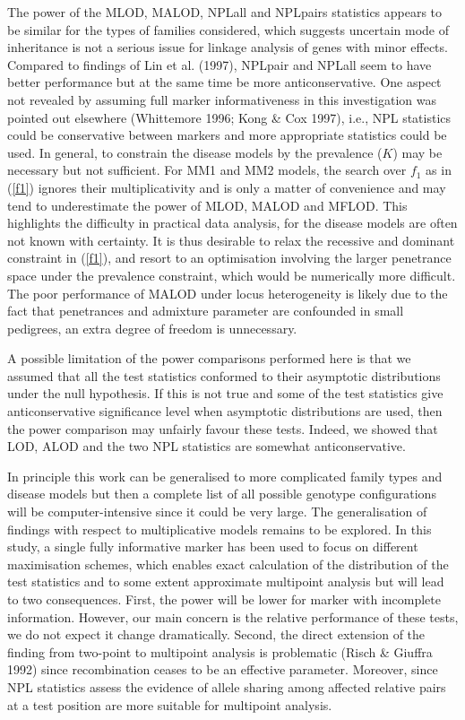 The power of the MLOD, MALOD, NPLall and NPLpairs statistics appears to be
similar for the types of families considered, which suggests uncertain
mode of inheritance is not a serious issue for linkage analysis of genes
with minor effects.  Compared to findings of Lin et al.  (1997), NPLpair
and NPLall seem to have better performance but at the same time be more
anticonservative.  One aspect not revealed by assuming full marker
informativeness in this investigation was pointed out elsewhere
(Whittemore 1996; Kong \& Cox 1997), i.e., NPL statistics could be
conservative between markers and more appropriate statistics could be
used.  In general, to constrain the disease models by the prevalence ($K$)
may be necessary but not sufficient.  For MM1 and MM2 models, the search
over $f_1$ as in (\ref{f1}) ignores their multiplicativity and is only a
matter of convenience and may tend to underestimate the power of MLOD,
MALOD and MFLOD. This highlights the difficulty in practical data
analysis, for the disease models are often not known with certainty. It is
thus desirable to relax the recessive and dominant constraint in
(\ref{f1}), and resort to an optimisation involving the larger penetrance
space under the prevalence constraint, which would be numerically more
difficult. The poor performance of MALOD under locus heterogeneity is
likely due to the fact that penetrances and admixture parameter are
confounded in small pedigrees, an extra degree of freedom is unnecessary.

A possible limitation of the power comparisons performed here is that we
assumed that all the test statistics conformed to their asymptotic
distributions under the null hypothesis. If this is not true and some of
the test statistics give anticonservative significance level when
asymptotic distributions are used, then the power comparison may unfairly
favour these tests. Indeed, we showed that LOD, ALOD and the two NPL
statistics are somewhat anticonservative.

In principle this work can be generalised to more complicated family types
and disease models but then a complete list of all possible genotype
configurations will be computer-intensive since it could be very large.  
The generalisation of findings with respect to multiplicative models
remains to be explored.  In this study, a single fully informative marker
has been used to focus on different maximisation schemes, which enables
exact calculation of the distribution of the test statistics and to some
extent approximate multipoint analysis but will lead to two consequences.  
First, the power will be lower for marker with incomplete information.  
However, our main concern is the relative performance of these tests, we
do not expect it change dramatically. Second, the direct extension of the
finding from two-point to multipoint analysis is problematic (Risch \&
Giuffra 1992) since recombination ceases to be an effective parameter.  
Moreover, since NPL statistics assess the evidence of allele sharing among
affected relative pairs at a test position are more suitable for
multipoint analysis.

